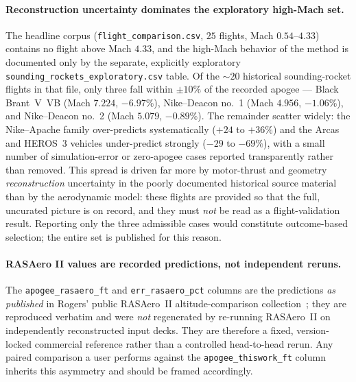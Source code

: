 \paragraph{Reconstruction uncertainty dominates the exploratory high-Mach set.}
The headline corpus (\texttt{flight\_comparison.csv}, $25$ flights, Mach
$0.54$--$4.33$) contains no flight above Mach $4.33$, and the high-Mach behavior
of the method is documented only by the separate, explicitly exploratory
\texttt{sounding\_rockets\_exploratory.csv} table. Of the $\sim$$20$ historical
sounding-rocket flights in that file, only three fall within $\pm10\%$ of the
recorded apogee --- Black Brant~V~VB (Mach $7.224$, $-6.97\%$), Nike--Deacon
no.~1 (Mach $4.956$, $-1.06\%$), and Nike--Deacon no.~2 (Mach $5.079$,
$-0.89\%$). The remainder scatter widely: the Nike--Apache family over-predicts
systematically ($+24$ to $+36\%$) and the Arcas and HEROS~3 vehicles
under-predict strongly ($-29$ to $-69\%$), with a small number of simulation-error
or zero-apogee cases reported transparently rather than removed. This spread is
driven far more by motor-thrust and geometry \emph{reconstruction} uncertainty in
the poorly documented historical source material than by the aerodynamic model:
these flights are provided so that the full, uncurated picture is on record, and
they must \emph{not} be read as a flight-validation result. Reporting only the
three admissible cases would constitute outcome-based selection; the entire set
is published for this reason.

\paragraph{RASAero II values are recorded predictions, not independent reruns.}
The \texttt{apogee\_rasaero\_ft} and \texttt{err\_rasaero\_pct} columns are the
predictions \emph{as published} in Rogers' public RASAero~II altitude-comparison
collection~\cite{rogers2015,rogers_rasaero_alt}; they are reproduced verbatim and
were \emph{not} regenerated by re-running RASAero~II on independently
reconstructed input decks. They are therefore a fixed, version-locked commercial
reference rather than a controlled head-to-head rerun. Any paired comparison a
user performs against the \texttt{apogee\_thiswork\_ft} column inherits this
asymmetry and should be framed accordingly.

